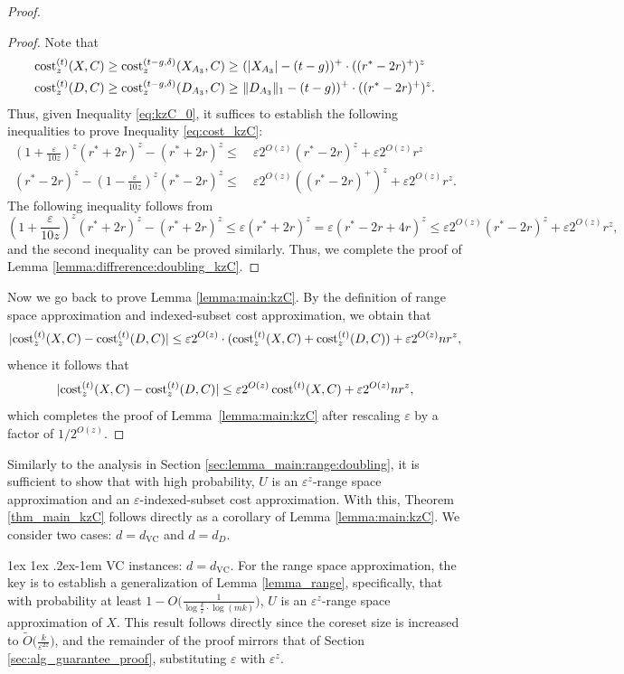 \documentclass[11pt,letterpaper]{article}
\makeatletter
\renewcommand{\paragraph}{%
  \@startsection{paragraph}{4}%
  {\z@}{1ex \@plus 1ex \@minus .2ex}{-1em}%
  {\normalfont\normalsize\bfseries}%
}
\theoremstyle{definition}
\newcommand{\eps}{\varepsilon}
\newcommand{\VC}{\ensuremath{\mathrm{VC}}}
\DeclarePairedDelimiter{\abs}{\lvert}{\rvert}
\DeclarePairedDelimiter{\norm}{\lVert}{\rVert}
\makeatother
\begin{document}
\begin{proof}
\begin{proof}
Note that 
\begin{align*}
\cost^{(t)}_z(X,C) \geq \cost[t-g, \delta]_z(X_{A_3},C) \geq & \ (\abs{X_{A_3}}-(t-g))^+ \cdot ((r^\ast - 2r)^+)^z \\
\cost^{(t)}_z(D,C) \geq \cost[t-g, \delta]_z(D_{A_3},C) \geq & \ \norm{D_{A_3}}_1 - (t-g))^+ \cdot ((r^\ast - 2r)^+)^z.
\end{align*}
%
Thus, given Inequality \eqref{eq:kzC_0}, it suffices to establish the following inequalities to prove Inequality \eqref{eq:cost_kzC}:
\begin{align*}
(1+\frac{\eps}{10z})^z(r^\ast +2r)^z - (r^\ast + 2r)^z \leq & \ \eps 2^{O(z)} (r^\ast - 2r)^z + \eps 2^{O(z)} r^z \\
(r^\ast -2r)^z - (1-\frac{\eps}{10z})^z(r^\ast - 2r)^z \leq & \ \eps 2^{O(z)} ((r^\ast - 2r)^+)^z + \eps 2^{O(z)} r^z.
\end{align*}
%
The following inequality follows from 
\[
(1+\frac{\eps}{10z})^z(r^\ast +2r)^z - (r^\ast +2r)^z \leq \eps (r^\ast +2r)^z = \eps (r^\ast-2r + 4r)^z 
\leq  \eps 2^{O(z)} (r^\ast - 2r)^z + \eps 2^{O(z)} r^z,
\]
and the second inequality can be proved similarly.
%
Thus, we complete the proof of Lemma \ref{lemma:diffrerence:doubling_kzC}.
\end{proof}

Now we go back to prove Lemma \ref{lemma:main:kzC}.
%
By the definition of range space approximation and indexed-subset cost approximation, we obtain that
    \[
	    \abs{ \cost[t]_z(X,C)-\cost[t]_z(D,C)} \leq \eps 2^{O(z)}\cdot (\cost[t]_z(X,C)+\cost[t]_z(D,C))+ \eps 2^{O(z)} nr^z,
    \]
    whence it follows that
    \[
	    \abs{ \cost[t]_z(X,C)-\cost[t]_z(D,C)} \leq \eps 2^{O(z)} \cost[t](X,C) + \eps 2^{O(z)} nr^z,
    \]
    which completes the proof of Lemma~\ref{lemma:main:kzC} after rescaling \(\eps\) by a factor of \(1/2^{O(z)}\).
\end{proof}

Similarly to the analysis in Section \ref{sec:lemma_main:range:doubling}, it is sufficient to show that with high probability, \( U \) is an \( \eps^z \)-range space approximation and an \( \eps \)-indexed-subset cost approximation.  
%
With this, Theorem \ref{thm_main_kzC} follows directly as a corollary of Lemma \ref{lemma:main:kzC}.
%
We consider two cases: $d = d_{\VC}$ and $d = d_D$.
%

\paragraph{VC instances: $d = d_{\VC}$.}
For the range space approximation, the key is to establish a generalization of Lemma \ref{lemma_range}, specifically, that with probability at least \( 1 - O\big(\frac{1}{\log \frac{k}{\eps}\cdot \log(mk)}\big) \), \( U \) is an \( \eps^z \)-range space approximation of \( X \).  
%
This result follows directly since the coreset size is increased to \( \tilde{O}\big(\frac{k}{\eps^{2z}}\big) \), and the remainder of the proof mirrors that of Section \ref{sec:alg_guarantee_proof}, substituting \( \eps \) with \( \eps^z \).
\end{document}
